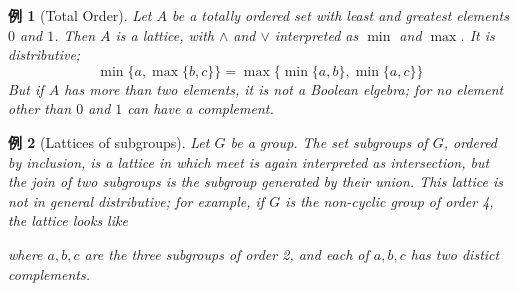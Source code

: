 \documentclass[a4j,12pt]{jarticle}
\numberwithin{equation}{section}
\newtheorem{example}{例}[section]
\begin{document}
\begin{example}[Total Order]
  Let $A$ be a totally ordered set with least and greatest elements $0$ and $1$. Then $A$ is a lattice, with $\wedge$ and $\vee$ interpreted as $\min$ and $\max$. It is distributive;
  \begin{equation}
    \min\{a, \max\{b,c\}\} = \max\{\min\{a,b\}, \min\{a,c\}\}
  \end{equation}
  But if $A$ has more than two elements, it is not a Boolean elgebra; for no element other than $0$ and $1$ can have a complement.
\end{example}
\begin{example}[Lattices of subgroups]
  Let $G$ be a group. The set subgroups of $G$, ordered by inclusion, is a lattice in which meet is again interpreted as intersection, but the join of two subgroups is the subgroup generated by their union.
  This lattice is not in general distributive; for example, if $G$ is the non-cyclic group of order 4, the lattice looks like
  \begin{figure}[H]
  \end{figure}
  where $a,b,c$ are the three subgroups of order 2, and each of $a,b,c$ has two distict complements.
\end{example}
\end{document}
